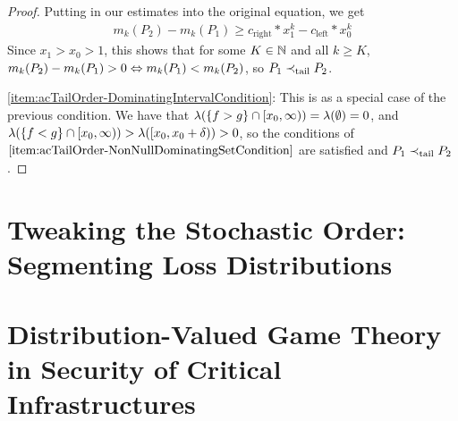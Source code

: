 \documentclass[a4paper]{scrreprt}
\begin{document}
\begin{proof}
        Putting in our estimates into the original equation, we get
        \begin{gather*}
            m_k(P_2) - m_k(P_1)
            \geq c_{\text{right}}*x_1^k - c_{\text{left}} * x_0^k
        \end{gather*}
        Since $x_1 > x_0 > 1$, this shows that for some $K \in \mathbb{N}$ and all $k \geq K$, $m_k(P_2) - m_k(P_1) > 0 \Leftrightarrow m_k(P_1) < m_k(P_2)$, so $P_1 \prec_{\text{tail}} P_2$.
        
        \ref{item:acTailOrder-DominatingIntervalCondition}:
        This is as a special case of the previous condition.
        We have that $\lambda(\{f > g\} \cap [x_0, \infty)) = \lambda(\emptyset) = 0$, and $\lambda(\{f < g\} \cap [x_0, \infty)) > \lambda([x_0, x_0 + \delta)) > 0$, so the conditions of $\ref{item:acTailOrder-NonNullDominatingSetCondition}$ are satisfied and $P_1 \prec_{\text{tail}} P_2$.
        
        
        
    \end{proof}
    
    
    \chapter{Tweaking the Stochastic Order: Segmenting Loss Distributions}
    
    
    \chapter{Distribution-Valued Game Theory in Security of Critical Infrastructures}
    
\end{document}
